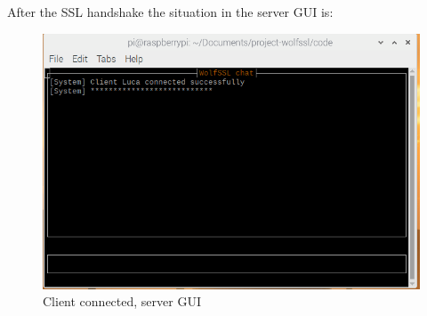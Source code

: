 \documentclass[a4paper,12pt]{article}
\begin{document}
After the SSL handshake the situation in the server GUI is:
\begin{figure}[H]
    \centering
    \includegraphics[scale=0.6]{./code/img/2-server.png}
    \caption{Client connected, server GUI}
    
\end{figure}
\end{document}

